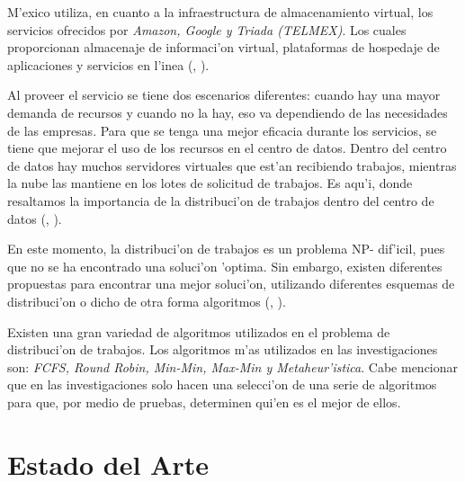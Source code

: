 M'exico utiliza, en cuanto a la infraestructura de almacenamiento virtual, los servicios ofrecidos por \textit{Amazon, Google y Triada (TELMEX)}. Los cuales proporcionan almacenaje de informaci'on virtual, plataformas de hospedaje de aplicaciones y servicios en l'inea (\citeauthor{mariscal2013computo}, \citeyear{mariscal2013computo}).

Al proveer el servicio se tiene dos escenarios diferentes: cuando hay una mayor demanda de recursos y cuando no la hay,  eso va dependiendo de las necesidades de las empresas. 
Para que se tenga una mejor eficacia durante los servicios, se tiene que mejorar el uso de los recursos en el centro de datos. Dentro del centro de datos hay muchos servidores virtuales que est'an recibiendo trabajos, mientras la nube las mantiene en los lotes de solicitud de trabajos. Es aqu'i, donde resaltamos la importancia de la distribuci'on de trabajos dentro del centro de datos (\citeauthor{shimpy2014different}, \citeyear{shimpy2014different}). 

En este momento, la distribuci'on de trabajos es un problema NP- dif'icil, pues que no se ha encontrado una soluci'on 'optima. Sin embargo, existen diferentes propuestas para encontrar una mejor soluci'on, utilizando diferentes esquemas de distribuci'on o dicho de otra forma algoritmos (\citeauthor{shimpy2014different}, \citeyear{shimpy2014different}). 

Existen una gran variedad de algoritmos utilizados en el problema de distribuci'on de trabajos. Los algoritmos m'as utilizados en las investigaciones son: \textit{FCFS, Round Robin, Min-Min, Max-Min y Metaheur'istica}. Cabe mencionar que en las investigaciones solo hacen una selecci'on de una serie de algoritmos para que, por medio de pruebas, determinen qui'en es el mejor de ellos. 


\newpage
\section{Estado del Arte}


